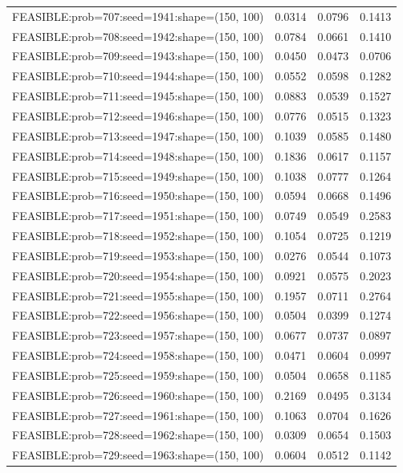 \begin{longtable}{lccc}
FEASIBLE:prob=707:seed=1941:shape=(150, 100) & 0.0314 & 0.0796 & 0.1413 \\
FEASIBLE:prob=708:seed=1942:shape=(150, 100) & 0.0784 & 0.0661 & 0.1410 \\
FEASIBLE:prob=709:seed=1943:shape=(150, 100) & 0.0450 & 0.0473 & 0.0706 \\
FEASIBLE:prob=710:seed=1944:shape=(150, 100) & 0.0552 & 0.0598 & 0.1282 \\
FEASIBLE:prob=711:seed=1945:shape=(150, 100) & 0.0883 & 0.0539 & 0.1527 \\
FEASIBLE:prob=712:seed=1946:shape=(150, 100) & 0.0776 & 0.0515 & 0.1323 \\
FEASIBLE:prob=713:seed=1947:shape=(150, 100) & 0.1039 & 0.0585 & 0.1480 \\
FEASIBLE:prob=714:seed=1948:shape=(150, 100) & 0.1836 & 0.0617 & 0.1157 \\
FEASIBLE:prob=715:seed=1949:shape=(150, 100) & 0.1038 & 0.0777 & 0.1264 \\
FEASIBLE:prob=716:seed=1950:shape=(150, 100) & 0.0594 & 0.0668 & 0.1496 \\
FEASIBLE:prob=717:seed=1951:shape=(150, 100) & 0.0749 & 0.0549 & 0.2583 \\
FEASIBLE:prob=718:seed=1952:shape=(150, 100) & 0.1054 & 0.0725 & 0.1219 \\
FEASIBLE:prob=719:seed=1953:shape=(150, 100) & 0.0276 & 0.0544 & 0.1073 \\
FEASIBLE:prob=720:seed=1954:shape=(150, 100) & 0.0921 & 0.0575 & 0.2023 \\
FEASIBLE:prob=721:seed=1955:shape=(150, 100) & 0.1957 & 0.0711 & 0.2764 \\
FEASIBLE:prob=722:seed=1956:shape=(150, 100) & 0.0504 & 0.0399 & 0.1274 \\
FEASIBLE:prob=723:seed=1957:shape=(150, 100) & 0.0677 & 0.0737 & 0.0897 \\
FEASIBLE:prob=724:seed=1958:shape=(150, 100) & 0.0471 & 0.0604 & 0.0997 \\
FEASIBLE:prob=725:seed=1959:shape=(150, 100) & 0.0504 & 0.0658 & 0.1185 \\
FEASIBLE:prob=726:seed=1960:shape=(150, 100) & 0.2169 & 0.0495 & 0.3134 \\
FEASIBLE:prob=727:seed=1961:shape=(150, 100) & 0.1063 & 0.0704 & 0.1626 \\
FEASIBLE:prob=728:seed=1962:shape=(150, 100) & 0.0309 & 0.0654 & 0.1503 \\
FEASIBLE:prob=729:seed=1963:shape=(150, 100) & 0.0604 & 0.0512 & 0.1142 \\

\end{longtable}
